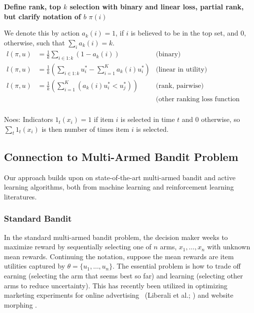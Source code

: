 \documentclass[a4paper,12pt]{article}
\begin{document}
\textbf{Define rank, top $k$ selection with binary and linear loss, partial rank, but clarify notation of $b$}
$\pi(i)$ 

We denote this by action $a_k(i)=1$, if $i$ is believed to be in the top set, and $0$, otherwise, such that $\sum_{i} a_k(i) = k$.
\begin{align} 
l(\pi,u) &= \frac{1}{k} \sum_{i \in 1:k} \left( 1 - a_k(i) \right) & \text{(binary)} \\
l(\pi,u) &= \frac{1}{k} \left( \sum_{i \in 1:k} u_{i}^{*} - \sum_{i = 1}^{K} a_k(i) u_{i}^{*} \right) & \text{(linear in utility)}\\
l(\pi,u) &= \frac{1}{k} \left( 
	\sum_{i = 1}^{K} ( a_k(i) u_{i}^{*} < u_{j}^{*} )
\right) & \text{(rank, pairwise)} \\
& & \text{(other ranking loss function here)} \\
\end{align}

Noes: 
Indicators $1_t(x_i)=1$ if item $i$ is selected in time $t$ and $0$ otherwise, so $\sum_{t} 1_t(x_i)$ is then number of times item $i$ is selected.





\subsection{Connection to Multi-Armed Bandit Problem}
Our approach builds upon on state-of-the-art multi-armed bandit and active learning algorithms, both from machine learning and reinforcement learning literatures. 

\subsubsection{Standard Bandit}

In the standard multi-armed bandit problem, the decision maker weeks to maximize reward by sequentially selecting one of $n$ arms, $x_1,\ldots,x_n$ with unknown mean rewards. Continuing the notation, suppose the mean rewards are item utilities captured by $\theta = \{u_1, \ldots, u_n\}$. The essential problem is how to trade off earning (selecting the arm that seems best so far) and learning (selecting other arms to reduce uncertainty). This has recently been utilized in optimizing marketing experiments for online advertising ~(Liberali et al.; \cite{schwartzetal2017,urban2013morphing}) and website morphing \citep{hauser2009website}. 
\end{document}
